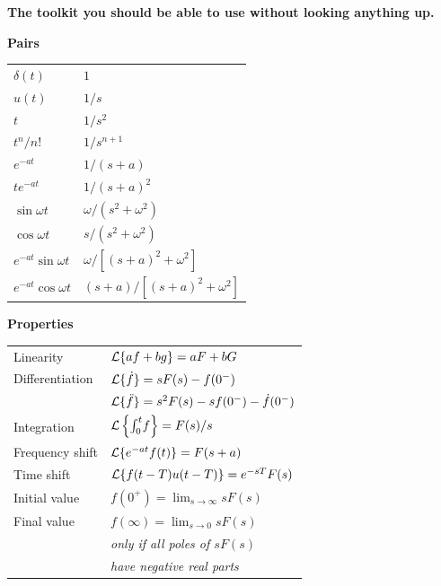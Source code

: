 \documentclass[11pt,a4paper]{article}
\begin{document}
\begin{readingbox}
\textbf{The toolkit you should be able to use without looking anything up.}

\smallskip
\begin{minipage}[t]{0.35\textwidth}
\textbf{Pairs}\\[2pt]
\footnotesize
\begin{tabular}{@{}ll@{}}
$\delta(t)$ & $1$\\
$u(t)$ & $1/s$\\
$t$ & $1/s^{2}$\\
$t^{n}/n!$ & $1/s^{n+1}$\\
$e^{-at}$ & $1/(s+a)$\\
$t e^{-at}$ & $1/(s+a)^{2}$\\
$\sin\omega t$ & $\omega/(s^{2}+\omega^{2})$\\
$\cos\omega t$ & $s/(s^{2}+\omega^{2})$\\
$e^{-at}\sin\omega t$ & $\omega/[(s+a)^{2}+\omega^{2}]$\\
$e^{-at}\cos\omega t$ & $(s+a)/[(s+a)^{2}+\omega^{2}]$\\
\end{tabular}
\end{minipage}
\hfill
\begin{minipage}[t]{0.58\textwidth}
\textbf{Properties}\\[2pt]
\footnotesize
\begin{tabular}{@{}ll@{}}
Linearity & $\mathcal{L}\{af+bg\}=aF+bG$\\
Differentiation & $\mathcal{L}\{\dot f\}=sF(s)-f(0^{-})$\\
 & $\mathcal{L}\{\ddot f\}=s^{2}F(s)-s f(0^{-})-\dot f(0^{-})$\\
Integration & $\mathcal{L}\left\{\int_{0}^{t}\!f\right\}=F(s)/s$\\
Frequency shift & $\mathcal{L}\{e^{-at}f(t)\}=F(s+a)$\\
Time shift & $\mathcal{L}\{f(t-T)u(t-T)\}=e^{-sT}F(s)$\\
Initial value & $f(0^{+})=\lim_{s\to\infty}sF(s)$\\
Final value & $f(\infty)=\lim_{s\to 0}sF(s)$\\
 & \emph{only if all poles of $sF(s)$}\\
 & \emph{have negative real parts}\\
\end{tabular}
\end{minipage}
\end{readingbox}
\end{document}
